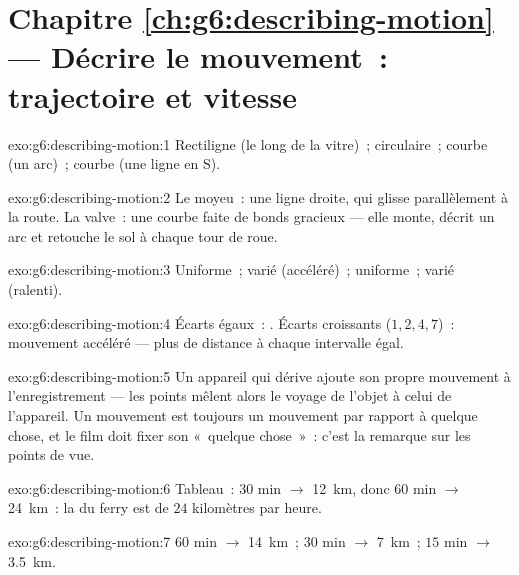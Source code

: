 \section*{Chapitre \ref{ch:g6:describing-motion} --- Décrire le mouvement~: trajectoire et vitesse}

\begin{solution}{exo:g6:describing-motion:1}
Rectiligne (le long de la vitre)~; circulaire~; courbe (un arc)~;
courbe (une ligne en S).
\end{solution}

\begin{solution}{exo:g6:describing-motion:2}
Le moyeu~: une ligne droite, qui glisse parallèlement à la route. La
valve~: une courbe faite de bonds gracieux --- elle monte, décrit un
arc et retouche le sol à chaque tour de roue.
\end{solution}

\begin{solution}{exo:g6:describing-motion:3}
Uniforme~; varié (accéléré)~; uniforme~; varié (ralenti).
\end{solution}

\begin{solution}{exo:g6:describing-motion:4}
Écarts égaux~: . Écarts croissants ($1, 2, 4,
7$)~: mouvement accéléré --- plus de distance à chaque intervalle
égal.
\end{solution}

\begin{solution}{exo:g6:describing-motion:5}
Un appareil qui dérive ajoute son propre mouvement à
l'enregistrement --- les points mêlent alors le voyage de l'objet à
celui de l'appareil. Un mouvement est toujours un mouvement par
rapport à quelque chose, et le film doit fixer son «~quelque
chose~»~: c'est la remarque sur les points de vue.
\end{solution}

\begin{solution}{exo:g6:describing-motion:6}
Tableau~: $30$ min $\to$ \qty{12}{km}, donc $60$ min $\to$
\qty{24}{km}~: la  du ferry est de $24$ kilomètres par heure.
\end{solution}

\begin{solution}{exo:g6:describing-motion:7}
$60$ min $\to$ \qty{14}{km}~; $30$ min $\to$ \qty{7}{km}~; $15$ min
$\to$ \qty{3.5}{km}.
\end{solution}

